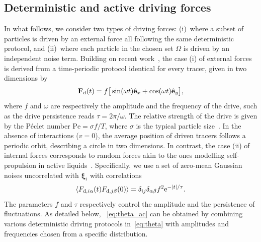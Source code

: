 \documentclass[superscriptaddress, twocolumn, prx, longbibliography, nofootinbib]{revtex4-1}
\begin{document}
\subsection{Deterministic and active driving forces}
\label{sec:map}
In what follows, we consider two types of driving forces: (i)~where a subset of particles is driven by an external force all following the same deterministic protocol, and (ii)~where each particle in the chosen set $\Omega$ is driven by an independent noise term. Building on recent work~\cite{Han2016, delJunco2018}, the case (i) of external forces is derived from a time-periodic protocol identical for every tracer, given in two dimensions by
\begin{equation}\label{eq:theta}
	{\bf F}_{\rm d}(t) = f \big[\sin(\omega t) \hat{\bf e}_x + \cos(\omega t)\hat{\bf e}_y \big] ,
\end{equation}
where $f$ and $\omega$ are respectively the amplitude and the frequency of the drive, such as the drive persistence reads $\tau=2\pi/\omega$. The relative strength of the drive is given by the P\'eclet number $\text{Pe} = \sigma f/T$, where $\sigma$ is the typical particle size~\cite{Han2016, delJunco2018}. In the absence of interactions ($v=0$), the average position of driven tracers follows a periodic orbit, describing a circle in two dimensions. In contrast, the case (ii) of internal forces corresponds to random forces akin to the ones modelling self-propulsion in active liquids~\cite{Fily2012, Redner2013, Maggi2015}. Specifically, we use a set of zero-mean Gaussian noises uncorrelated with ${\boldsymbol\xi}_i$ with correlations 
\begin{equation}\label{eq:theta_ac}
	\langle F_{{\rm d},i\alpha}(t) F_{{\rm d},j\beta}(0) \rangle = \delta_{ij}\delta_{\alpha\beta} f^2 {\rm e}^{-|t|/\tau} .
\end{equation}
The parameters $f$ and $\tau$ respectively control the amplitude and the persistence of fluctuations. As detailed below, ~\eqref{eq:theta_ac} can be obtained by combining various deterministic driving protocols in~\eqref{eq:theta} with amplitudes and frequencies chosen from a specific distribution. 


\end{document}
